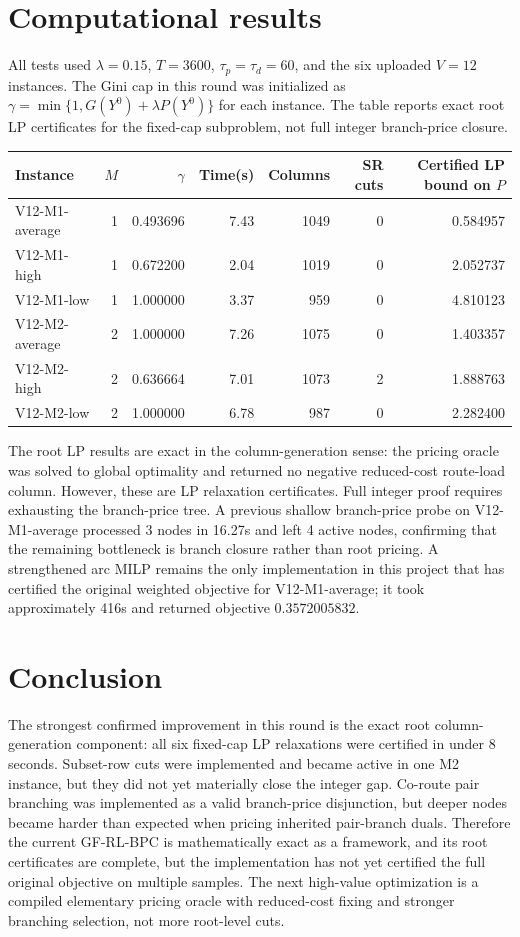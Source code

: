 \documentclass[11pt]{article}
\begin{document}
\section{Computational results}
All tests used $\lambda=0.15$, $T=3600$, $\tau_p=\tau_d=60$, and the six uploaded $V=12$ instances. The Gini cap in this round was initialized as $\gamma=\min\{1,G(Y^0)+\lambda P(Y^0)\}$ for each instance. The table reports exact root LP certificates for the fixed-cap subproblem, not full integer branch-price closure.

\begin{center}
\begin{tabular}{lrrrrrr}
\toprule
Instance & $M$ & $\gamma$ & Time(s) & Columns & SR cuts & Certified LP bound on $P$\\
\midrule
V12-M1-average & 1 & 0.493696 & 7.43 & 1049 & 0 & 0.584957\\
V12-M1-high & 1 & 0.672200 & 2.04 & 1019 & 0 & 2.052737\\
V12-M1-low & 1 & 1.000000 & 3.37 & 959 & 0 & 4.810123\\
V12-M2-average & 2 & 1.000000 & 7.26 & 1075 & 0 & 1.403357\\
V12-M2-high & 2 & 0.636664 & 7.01 & 1073 & 2 & 1.888763\\
V12-M2-low & 2 & 1.000000 & 6.78 & 987 & 0 & 2.282400\\
\bottomrule
\end{tabular}
\end{center}

The root LP results are exact in the column-generation sense: the pricing oracle was solved to global optimality and returned no negative reduced-cost route-load column. However, these are LP relaxation certificates. Full integer proof requires exhausting the branch-price tree. A previous shallow branch-price probe on V12-M1-average processed 3 nodes in 16.27s and left 4 active nodes, confirming that the remaining bottleneck is branch closure rather than root pricing. A strengthened arc MILP remains the only implementation in this project that has certified the original weighted objective for V12-M1-average; it took approximately 416s and returned objective $0.3572005832$.

\section{Conclusion}
The strongest confirmed improvement in this round is the exact root column-generation component: all six fixed-cap LP relaxations were certified in under 8 seconds. Subset-row cuts were implemented and became active in one M2 instance, but they did not yet materially close the integer gap. Co-route pair branching was implemented as a valid branch-price disjunction, but deeper nodes became harder than expected when pricing inherited pair-branch duals. Therefore the current GF-RL-BPC is mathematically exact as a framework, and its root certificates are complete, but the implementation has not yet certified the full original objective on multiple samples. The next high-value optimization is a compiled elementary pricing oracle with reduced-cost fixing and stronger branching selection, not more root-level cuts.
\end{document}
